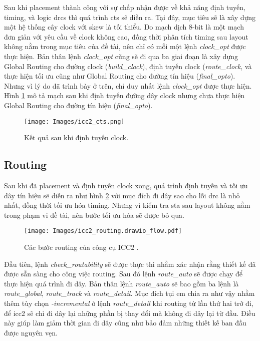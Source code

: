 Sau khi placement thành công với sự chấp nhận được về khả năng định tuyến, timing, và logic \acrshort{drc}s thì quá trình \acrfull{cts} sẽ diễn ra. Tại đây, mục tiêu sẽ là xây dựng một hệ thống cây clock với skew là tối thiểu. Do mạch dịch 8-bit là một mạch đơn giản với yêu cầu về clock không cao, đồng thời phân tích timing sau layout không nằm trong mục tiêu của đề tài, nên chỉ có mỗi một lệnh \textit{clock\_opt} được thực hiện. Bản thân lệnh \textit{clock\_opt} cũng sẽ đi qua ba giai đoạn là xây dựng Global Routing cho đường clock (\textit{build\_clock}), định tuyến clock (\textit{route\_clock}, và thực hiện tối ưu cũng như Global Routing cho đường tín hiệu (\textit{final\_opto}). Nhưng vì lý do đã trình bày ở trên, chỉ duy nhất lệnh \textit{clock\_opt} được thực hiện. Hình \ref{fig:icc2-cts} mô tả mạch sau khi định tuyến đường dây clock nhưng chưa thực hiện Global Routing cho đường tín hiệu (\textit{final\_opto}).

\begin{figure}[htp]
\centering
\captionsetup{justification=centering,margin=2cm}
\texttt{[image: Images/icc2\_cts.png]}
\caption{Kết quả sau khi định tuyến clock.}
\label{fig:icc2-cts}
\end{figure}

\subsection{Routing}

Sau khi đã placement và định tuyến clock xong, quá trình định tuyến và tối ưu dây tín hiệu sẽ diễn ra như hình \ref{fig:icc2-routing-flow} với mục đích đi dây sao cho lỗi \acrshort{drc} là nhỏ nhất, đồng thời tối ưu hóa timing. Nhưng vì kiểm tra \acrshort{sta} sau layout không nằm trong phạm vi đề tài, nên bước tối ưu hóa sẽ được bỏ qua.

\begin{figure}[htp]
\centering
\captionsetup{justification=centering,margin=2cm}
\texttt{[image: Images/icc2\_routing.drawio\_flow.pdf]}
\caption{Các bước routing của công cụ ICC2 \cite{synopsys-iccompilerii}.}
\label{fig:icc2-routing-flow}
\end{figure}

Đầu tiên, lệnh \textit{check\_routability} sẽ được thực thi nhằm xác nhận rằng thiết kế đã được sẵn sàng cho công việc routing. Sau đó lệnh \textit{route\_auto} sẽ được chạy để thực hiện quá trình đi dây. Bản thân lệnh \textit{route\_auto} sẽ bao gồm ba lệnh là \textit{route\_global}, \textit{route\_track} và \textit{route\_detail}. Mục đích tụi em chia ra như vậy nhằm thêm tùy chọn \textit{-incremental} ở lệnh \textit{route\_detail} khi routing từ lần thứ hai trở đi, để \acrshort{icc2} sẽ chỉ đi dây lại những phần bị thay đổi mà không đi dây lại từ đầu. Điều này giúp làm giảm thời gian đi dây cũng như bảo đảm những thiết kế ban đầu được nguyên vẹn.

